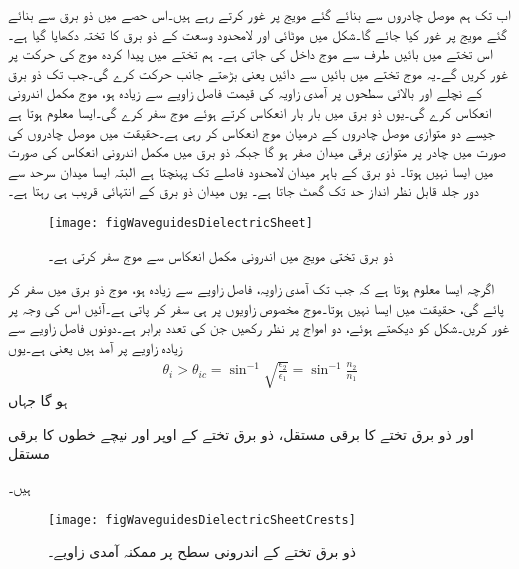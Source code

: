 اب تک ہم موصل چادروں سے بنائے گئے مویج پر غور کرتے رہے ہیں۔اس حصے میں ذو برق سے بنائے گئے مویج پر غور کیا جائے گا۔شکل  میں  موٹائی اور لامحدود وسعت کے ذو برق کا تختہ دکھایا گیا ہے۔اس تختے میں بائیں طرف سے  موج داخل کی جاتی ہے۔ ہم تختے میں پیدا کردہ موج کی حرکت پر غور کریں گے۔یہ موج تختے میں بائیں سے دائیں یعنی  بڑھتے  جانب حرکت کرے گی۔جب تک ذو برق کے نچلے اور بالائی سطحوں پر آمدی زاویہ کی قیمت فاصل زاویے سے زیادہ ہو، موج مکمل اندرونی انعکاس کرے گی۔یوں ذو برق میں بار بار انعکاس کرتے ہوئے  موج سفر کرے گی۔ایسا معلوم ہوتا ہے جیسے  دو متوازی موصل چادروں کے درمیان موج انعکاس کر رہی ہے۔حقیقت میں موصل چادروں کی صورت میں چادر پر متوازی برقی میدان صفر ہو گا جبکہ ذو برق میں مکمل اندرونی انعکاس کی صورت میں ایسا نہیں ہوتا۔ ذو برق  کے باہر میدان  لامحدود فاصلے تک پہنچتا ہے البتہ ایسا میدان سرحد سے دور جلد قابل نظر انداز حد تک گھٹ جاتا ہے۔ یوں میدان ذو برق کے انتہائی قریب ہی رہتا ہے۔
\begin{figure}
\centering
\texttt{[image: figWaveguidesDielectricSheet]}
\caption{ذو برق تختی مویج میں اندرونی مکمل انعکاس سے موج سفر کرتی ہے۔}
\label{شکل_مویج_تختہ}
\end{figure}

اگرچہ ایسا معلوم ہوتا ہے کہ  جب تک آمدی زاویہ، فاصل زاویے سے زیادہ  ہو، موج ذو برق میں سفر کر پائے گی، حقیقت میں ایسا نہیں ہوتا۔موج مخصوص زاویوں پر ہی سفر کر پاتی ہے۔آئیں اس کی وجہ پر غور کریں۔شکل کو دیکھتے ہوئے، دو  امواج پر نظر رکھیں جن کی تعدد برابر ہے۔دونوں فاصل زاویے سے زیادہ زاویے پر آمد ہیں یعنی  ہے۔یوں
\begin{align}\label{مساوات_مویج_ابن_سھل_قانون}
\theta_i > \theta_{ic}=\sin^{-1} \sqrt{\frac{\epsilon_2}{\epsilon_1}}=\sin^{-1}\frac{n_2}{n_1}
\end{align}
ہو گا جہاں 
\begin{description}
 اور
 ذو برق تختے کا برقی مستقل،
 ذو برق تختے کے اوپر اور نیچے خطوں کا برقی مستقل
\end{description}
ہیں۔

\begin{figure}
\centering
\texttt{[image: figWaveguidesDielectricSheetCrests]}
\caption{ذو برق تختے کے اندرونی سطح پر ممکنہ آمدی زاویے۔}
\label{شکل_مویج_تختہ_ممکنہ_راستے}
\end{figure}

